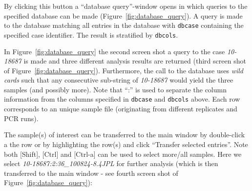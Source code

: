 \documentclass[a4paper,11pt]{article}
\newcommand{\code}[1]{\texttt{#1}}
\begin{document}
By clicking this button a ``database query''-window opens in which
queries to the specified database can be made
(Figure~\ref{fig:database_query}). A query is made to the database
matching all entries in the database with \code{dbcase} containing the
specified case identifier. The result is stratified by \code{dbcols}.

In Figure~\ref{fig:database_query} the second screen shot a query to
the case \textsl{10-18687} is made and three different analysis
results are returned (third screen shot of
Figure~\ref{fig:database_query}). Furthermore, the call to the
database uses \textsl{wild cards} such that any consecutive sub-string
of \textsl{10-18687} would yield the three samples (and possibly
more). Note that ``:'' is used to separate the column information from
the columns specified in \code{dbcase} and \code{dbcols} above. Each
row corresponds to an unique sample file (originating from different
replicates and PCR runs).

The sample(s) of interest can be transferred to the main window by
double-click a the row or by highlighting the row(s) and click
``Transfer selected entries''. Note both [Shift], [Ctrl] and [Ctrl-a]
can be used to select more/all samples. Here we select
\textsl{10-18687:2:36\_100824-8.4JPL} for further analysis (which is
then transferred to the main window - see fourth screen shot of
Figure~\ref{fig:database_query}):
\end{document}
